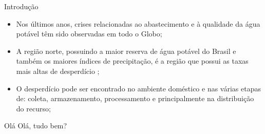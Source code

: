 \begin{frame}{Introdução}
\begin{itemize}
\item Nos últimos anos, crises relacionadas ao abastecimento e à qualidade da água potável têm sido observadas em todo o Globo;
\item A região norte, possuindo a maior reserva de água potável do Brasil e também os maiores índices de precipitação, é a região que possui as taxas mais altas de desperdício \cite{globo};
\item O desperdício pode ser encontrado no ambiente doméstico e nas várias etapas de: coleta, armazenamento, processamento e principalmente na distribuição do recurso;
\end{itemize}
\end{frame}

\begin{frame}{Olá}
    Olá, tudo bem?
\end{frame}